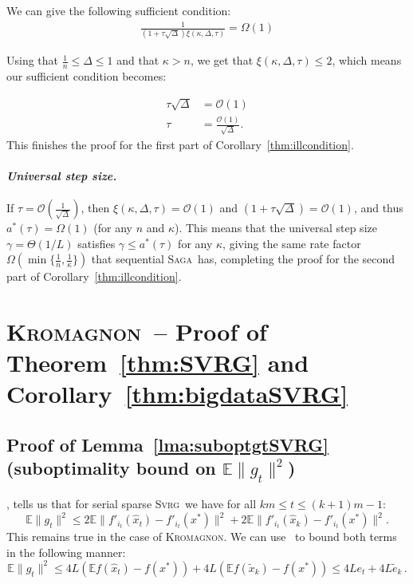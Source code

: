 \documentclass[twoside, 11pt]{article}
\newcommand{\stepsize}{\gamma}
\newcommand{\overlap}{\tau}
\newcommand{\sparsity}{\Delta}
\newcommand{\lipschitz}{L}
\newcommand{\E}{\mathbb{E}}
\newcommand{\SAGA}{\textsc{Saga}}
\newcommand{\SVRG}{\textsc{Svrg}}
\newcommand{\KROMAGNON}{\textsc{Kromagnon}}
\begin{document}
We can give the following sufficient condition:
\begin{align}
\frac{1}{\left(1+ \overlap  \sqrt \sparsity \right) \xi(\kappa, \sparsity, \overlap)} = \Omega(1)
\end{align}

Using that $\frac{1}{n} \leq \sparsity \leq 1$ and that $\kappa > n$, we get that $\xi(\kappa, \sparsity, \overlap) \leq 2$, which means our sufficient condition becomes:

\begin{align}
\overlap \sqrt{\sparsity} &= \mathcal{O}(1)
\nonumber \\
\overlap &= \frac{\mathcal{O}(1)}{\sqrt{\sparsity}} .
\end{align}
This finishes the proof for the first part of Corollary~\ref{thm:illcondition}.

\paragraph{\textit{Universal step size.}}
If $\overlap = \mathcal{O}(\frac{1}{\sqrt{\sparsity}})$, then $\xi(\kappa, \sparsity, \overlap) = \mathcal{O}(1)$ and $(1+\overlap \sqrt{\sparsity}) = \mathcal{O}(1)$, and thus $a^*(\overlap) = \Omega(1)$ (for any $n$ and $\kappa$). This means that the universal step size $\stepsize = \Theta(1/L)$ satisfies $\stepsize \leq a^*(\overlap)$ for any $\kappa$, giving the same rate factor $\Omega( \min\{\frac{1}{n}, \frac{1}{\kappa}\})$ that sequential \SAGA\ has, completing the proof for the second part of Corollary~\ref{thm:illcondition}.
\hfill\BlackBox

\section{\KROMAGNON\ -- Proof of Theorem~\ref{thm:SVRG} and Corollary~\ref{thm:bigdataSVRG}}\label{apx:SVRG}
\subsection{Proof of Lemma~\ref{lma:suboptgtSVRG} (suboptimality bound on $\E \|g_t\|^2$)}\label{apx:SVRGlemma}
\citet[Lemma~9]{mania}, tells us that for serial sparse \SVRG\, we have for all $km \leq t \leq (k+1)m -1$:
\begin{equation}
\E\|g_t\|^2
\leq 2 \E \|f'_{i_t}(\hat x_t)-f'_{i_t}(x^*)\|^2
+ 2 \E \|f'_{i_t}(\hat x_k) - f'_{i_t}(x^*)\|^2 .
\end{equation}
This remains true in the case of \KROMAGNON.
We can use~\citet[Equations 7 and 8]{qsaga} to bound both terms in the following manner:
\begin{equation}
\E\|g_t\|^2
\leq 4 \lipschitz (\E f(\hat x_t)-f(x^*))
+ 4 \lipschitz (\E f(\tilde x_k) - f(x^*))
\leq 4\lipschitz e_t + 4 \lipschitz \tilde e_k \,.
\end{equation}
\hfill\BlackBox
\end{document}
